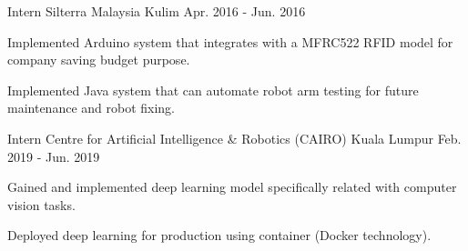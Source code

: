 

\begin{cventries}

  \cventry
    {Intern}
    {Silterra Malaysia}
    {Kulim}
    {Apr. 2016 - Jun. 2016}
    {
      \begin{cvitems}
        \item {Implemented Arduino system that integrates with a MFRC522 RFID model for company saving budget purpose.}
        \item {Implemented Java system that can automate robot arm testing for future maintenance and robot fixing.}
      \end{cvitems}
    }

  \cventry
    {Intern}
    {Centre for Artificial Intelligence \& Robotics (CAIRO)}
    {Kuala Lumpur}
    {Feb. 2019 - Jun. 2019}
    {
      \begin{cvitems}
        \item {Gained and implemented deep learning model specifically related with computer vision tasks.}
        \item {Deployed deep learning for production using container (Docker technology).}
      \end{cvitems}
    }

\end{cventries}
